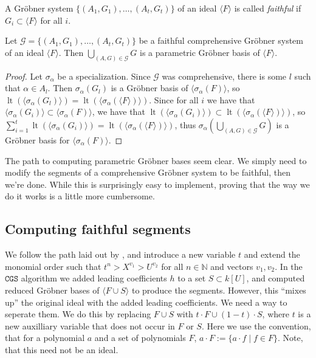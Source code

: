 \documentclass[a4paper, 12pt]{article}
\newcommand{\N}{\mathbb{N}}
\DeclareMathOperator{\LT}{lt}
\theoremstyle{changedot}
\theoremstyle{changedotbreak}
\theoremstyle{nonumberplain}
\newtheorem{proof}{Proof}
\begin{document}
\begin{definition}
  A Gröbner system $\{(A_{1}, G_{1}), \dots, (A_{t}, G_{t})\}$ of an ideal $\langle F \rangle$ is called \textit{faithful} if $G_{i} \subset \langle F \rangle$ for all $i$.
\end{definition}

\begin{corollary}\label{cor:faithful_cgs_to_cgb}
  Let $\mathcal G = \{(A_{1}, G_{1}), \dots, (A_{t}, G_{t})\}$ be a faithful comprehensive Gröbner system of an ideal $\langle F \rangle$. Then $\bigcup_{(A, G) \in \mathcal G} G$ is a parametric Gröbner basis of $\langle F \rangle$.
\end{corollary}
\begin{proof}
  Let $\sigma_{\alpha}$ be a specialization. Since $\mathcal G$ was comprehensive, there is some $l$ such that $\alpha \in A_{l}$. Then $\sigma_{\alpha}(G_{l})$ is a Gröbner basis of $\langle \sigma_{\alpha}(F) \rangle$, so $\LT( \langle \sigma_{\alpha}(G_{l}) \rangle) = \LT( \langle \sigma_{\alpha}(\langle F \rangle) \rangle)$. Since for all $i$ we have that $\langle \sigma_{\alpha}(G_{i}) \rangle \subset \langle \sigma_{\alpha}(F) \rangle$, we have that $\LT( \langle \sigma_{\alpha}(G_{i}) \rangle ) \subset \LT( \langle \sigma_{\alpha}(\langle F \rangle) \rangle)$, so $\sum_{i=1}^{t} \LT( \langle \sigma_{\alpha}(G_{i}) \rangle) = \LT(\langle \sigma_{\alpha}(\langle F \rangle) \rangle )$, thus $\sigma_{\alpha}\left(\bigcup_{(A, G) \in \mathcal G} G\right)$ is a Gröbner basis for $\langle \sigma_{\alpha}(F) \rangle$.
\end{proof}

The path to computing parametric Gröbner bases seem clear. We simply need to modify the segments of a comprehensive Gröbner system to be faithful, then we're done. While this is surprisingly easy to implement, proving that the way we do it works is a little more cumbersome.

\subsection{Computing faithful segments}

We follow the path laid out by \cite{ss_algo}, and introduce a new variable $t$ and extend the monomial order such that $t^{n} > X^{v_{1}} > U^{v_{2}}$ for all $n \in \N$ and vectors $v_{1}, v_{2}$. In the $\mathtt{CGS}$ algorithm we added leading coefficients $h$ to a set $S \subset k[U]$, and computed reduced Gröbner bases of $\langle F \cup S \rangle$ to produce the segments. However, this ``mixes up'' the original ideal with the added leading coefficients. We need a way to seperate them. We do this by replacing $F \cup S$ with $t\cdot F \cup (1-t)\cdot S$, where $t$ is a new auxilliary variable that does not occur in $F$ or $S$. Here we use the convention, that for a polynomial $a$ and a set of polynomials $F$, $a\cdot F := \{a \cdot f \mid f \in F\}$. Note, that this need not be an ideal.
\end{document}
